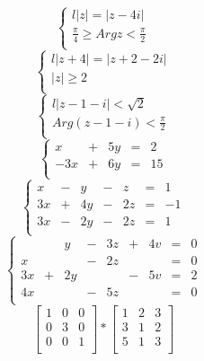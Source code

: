 \documentclass[11pt,a4paper]{article}
\begin{document}
$$\begin{cases}{l}
|z|=|z-4i| \\
\frac{\pi}{4} \geq Arg z < \frac{\pi}{2}\\
\end{cases}
$$
\newline
$$
\begin{cases}{l}
|z+4|=|z+2-2i| \\
|z| \geq 2\\
\end{cases} $$
\newline
$$
\begin{cases}{l}
|z-1-i|<\sqrt{2} \\
Arg(z-1-i)<\frac{\pi}{2}\\
\end{cases}
$$
\newline
$$
\left\{
\begin{array}{rrrrr}
x & + & 5y & = & 2 \\
-3x & + & 6y & = & 15\\
\end{array}
\right.$$
\newline
$$
\left\{
\begin{array}{rrrrrrr}
x & - & y & - & z & = & 1 \\
3x & + & 4y & - & 2z & = & -1\\
3x & - & 2y & - & 2z & = & 1\\
\end{array}
\right.$$
\newline
$$
\left\{
\begin{array}{rrrrrrrrr}
 &  & y & - & 3z & + & 4v & = & 0 \\
x & & & - & 2z &  &  & = & 0\\
3x & + & 2y & & & - & 5v & = & 2\\
4x & & & - & 5z & & & = & 0\\
\end{array}
\right.$$
\newline
$$
\left[ \begin{array}{ccc}
1 & 0 & 0 \\
0 & 3 & 0 \\
0 & 0 & 1 \\
\end{array} \right]
*
\left[ \begin{array}{ccc}
1 & 2 & 3 \\
3 & 1 & 2 \\
5 & 1 & 3 \\
\end{array} \right]
$$
\end{document}
